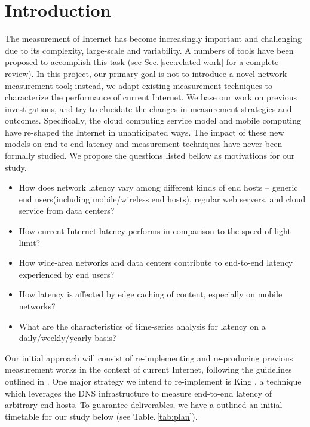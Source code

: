 \section{Introduction}
\label{sec:introduction}

The measurement of Internet has become increasingly important and challenging due to its complexity, large-scale and variability. A numbers of tools have been proposed to accomplish this task (see Sec.\,\ref{sec:related-work} for a complete review). In this project, our primary goal is not to introduce a novel network measurement tool; instead, we adapt existing measurement techniques to characterize the performance of current Internet. We base our work on previous investigations, and try to elucidate the changes in measurement strategies and outcomes. Specifically, the cloud computing service model and mobile computing have re-shaped the Internet in unanticipated ways. The impact of these new models on end-to-end latency and measurement techniques have never been formally studied. We propose the questions listed bellow as motivations for our study.

\begin{itemize}
\item How does network latency vary among different kinds of end hosts -- generic end users(including mobile/wireless end hosts), regular web servers, and cloud service from data centers?
\item How current Internet latency performs in comparison to the speed-of-light limit?
\item How wide-area networks and data centers contribute to end-to-end latency experienced by end users?
\item How latency is affected by edge caching of content, especially on mobile networks?
\item What are the characteristics of time-series analysis for latency on a daily/weekly/yearly basis?
\end{itemize}

Our initial approach will consist of re-implementing and re-producing previous measurement works in the context of current Internet, following the guidelines outlined in \cite{paxson2004strategies}. One major strategy we intend to re-implement is King \cite{gummadi2002king}, a technique which leverages the DNS infrastructure to measure end-to-end latency of arbitrary end hosts. To guarantee deliverables, we have a outlined an initial timetable for our study below (see Table.\,\ref{tab:plan}).

